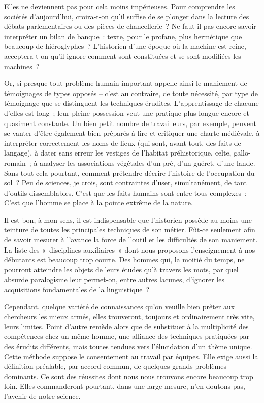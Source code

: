 \documentclass[french,twoside]{book} %
\begin{document}
\label{p28} Elles ne deviennent pas pour cela moins impérieuses. Pour comprendre les sociétés d’aujourd’hui, croira‑t‑on qu’il suffise de se plonger dans la lecture des débats parlementaires ou des pièces de chancellerie ? Ne faut‑il pas encore savoir interpréter un bilan de banque : texte, pour le profane, plus hermétique que beaucoup de hiéroglyphes ? L’historien d’une époque où la machine est reine, acceptera‑t‑on qu’il ignore comment sont constituées et se sont modifiées les machines ?\par
Or, si presque tout problème humain important appelle ainsi le manie­ment de témoignages de types opposés – c’est au contraire, de toute nécessité, par type de témoignage que se distinguent les techniques érudites. L’apprentissage de chacune d’elles est long ; leur pleine possession veut une pratique plus longue encore et quasiment constante. Un bien petit nombre de travailleurs, par exemple, peuvent se vanter d’être également bien préparés à lire et critiquer une charte médiévale, à interpréter cor­rectement les noms de lieux (qui sont, avant tout, des faits de langage), à dater sans erreur les vestiges de l’habitat préhistorique, celte, gallo­-romain ; à analyser les associations végétales d’un pré, d’un guéret, d’une lande. Sans tout cela pourtant, comment prétendre décrire l’histoire de l’occupation du sol ? Peu de sciences, je crois, sont contraintes d’user, simultanément, de tant d’outils dissemblables. C’est que les faits humains sont entre tous complexes : C’est que l’homme se place à la pointe extrême de la nature.\par
Il est bon, à mon sens, il est indispensable que l’historien possède au moins une teinture de toutes les principales techniques de son métier. Fût‑ce seulement afin de savoir mesurer à l’avance la force de l’outil et les difficultés de son maniement. La liste des « disciplines auxiliaires » dont nous proposons l’enseignement à nos débutants est beaucoup trop courte. Des hommes qui, la moitié du temps, ne pourront atteindre les objets de leurs études qu’à travers les mots, par quel absurde paralogisme leur permet‑on, entre autres lacunes, d’ignorer les acquisitions fondamen­tales de la linguistique ?\par
Cependant, quelque variété de connaissances qu’on veuille bien prêter aux chercheurs les mieux armés, elles trouveront, toujours et ordinaire­ment très vite, leurs limites. Point d’autre remède alors que de substituer à la multiplicité des compétences chez un même homme, une alliance des techniques pratiquées par des érudits différents, mais toutes tendues vers l’élucidation d’un thème unique. Cette méthode suppose le consen­tement au travail par équipes. Elle exige aussi la définition préalable, par accord commun, de quelques grands problèmes dominants. Ce sont des réussites dont nous nous trouvons encore beaucoup trop loin. Elles commanderont pourtant, dans une large mesure, n’en doutons pas, l’avenir de notre science.
\end{document}
